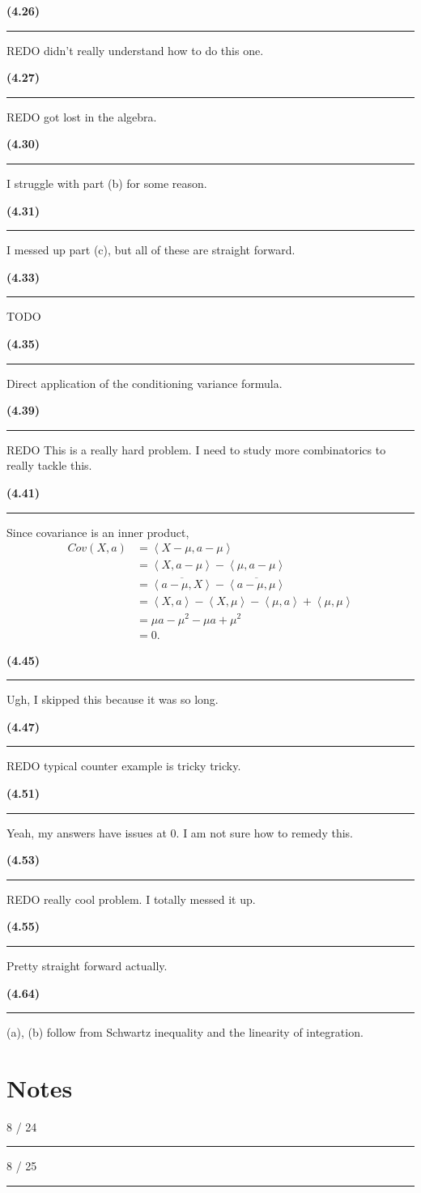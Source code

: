 \documentclass[12pt, reqno]{amsart}
\numberwithin{equation}{section}
\newcommand{\innerproduct}[2]{\left\langle{ #1, #2 }\right\rangle}
\begin{document}
{\bf (4.26)\rule{\textwidth}{.5pt}}

REDO didn't really understand how to do this one.

{\bf (4.27)\rule{\textwidth}{.5pt}}

REDO got lost in the algebra.

{\bf (4.30)\rule{\textwidth}{.5pt}}

I struggle with part (b) for some reason.

{\bf (4.31)\rule{\textwidth}{.5pt}}

I messed up part (c), but all of these are straight forward.

{\bf (4.33)\rule{\textwidth}{.5pt}}

TODO

{\bf (4.35)\rule{\textwidth}{.5pt}}

Direct application of the conditioning variance formula.

{\bf (4.39)\rule{\textwidth}{.5pt}}

REDO This is a really hard problem. I need to study more combinatorics to really tackle this.

{\bf (4.41)\rule{\textwidth}{.5pt}}

Since covariance is an inner product,
\begin{align*}
Cov(X, a)
&= \innerproduct{X - \mu}{a - \mu} \\
&= \innerproduct{X}{a - \mu} - \innerproduct{\mu}{a - \mu} \\
&= \overline{\innerproduct{a - \mu}{X}} - \overline{\innerproduct{a - \mu}{\mu}} \\
&= \innerproduct{X}{a}  - \innerproduct{X}{\mu} - \innerproduct{\mu}{a} + \innerproduct{\mu}{\mu} \\
&= \mu a - \mu^2 - \mu a + \mu^2 \\
&= 0.
\end{align*}

{\bf (4.45)\rule{\textwidth}{.5pt}}

Ugh, I skipped this because it was so long.

{\bf (4.47)\rule{\textwidth}{.5pt}}

REDO typical counter example is tricky tricky.

{\bf (4.51)\rule{\textwidth}{.5pt}}

Yeah, my answers have issues at 0. I am not sure how to remedy this.

{\bf (4.53)\rule{\textwidth}{.5pt}}

REDO really cool problem. I totally messed it up.

{\bf (4.55)\rule{\textwidth}{.5pt}}

Pretty straight forward actually.

{\bf (4.64)\rule{\textwidth}{.5pt}}

(a), (b) follow from Schwartz inequality and the linearity of integration.

\section*{Notes}

8 / 24
\rule{\textwidth}{.5pt}

8 / 25
\rule{\textwidth}{.5pt}
\end{document}
